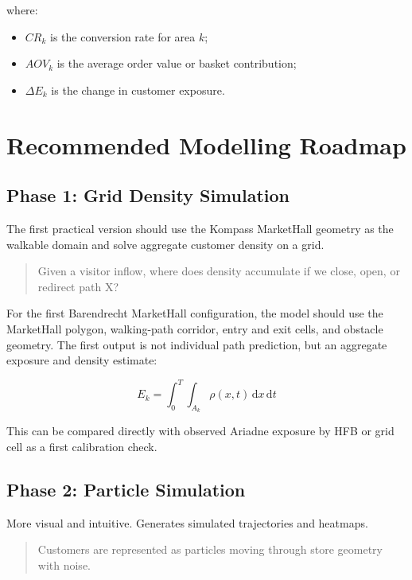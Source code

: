 \documentclass[11pt,a4paper]{article}
\begin{document}
where:

\begin{itemize}[leftmargin=*]
    \item $CR_k$ is the conversion rate for area $k$;
    \item $AOV_k$ is the average order value or basket contribution;
    \item $\Delta E_k$ is the change in customer exposure.
\end{itemize}

\section{Recommended Modelling Roadmap}

\subsection*{Phase 1: Grid Density Simulation}

The first practical version should use the Kompass MarketHall geometry as the walkable domain and solve aggregate customer density on a grid.

\begin{quote}
Given a visitor inflow, where does density accumulate if we close, open, or redirect path X?
\end{quote}

For the first Barendrecht MarketHall configuration, the model should use the MarketHall polygon, walking-path corridor, entry and exit cells, and obstacle geometry. The first output is not individual path prediction, but an aggregate exposure and density estimate:

\begin{equation}
E_k = \int_0^T \int_{A_k} \rho(x,t)\,\mathrm{d}x\,\mathrm{d}t
\end{equation}

This can be compared directly with observed Ariadne exposure by HFB or grid cell as a first calibration check.

\subsection*{Phase 2: Particle Simulation}

More visual and intuitive. Generates simulated trajectories and heatmaps.

\begin{quote}
Customers are represented as particles moving through store geometry with noise.
\end{quote}
\end{document}
